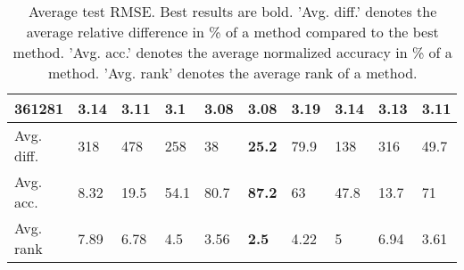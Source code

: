 \begin{table}[ht!]
\begin{tabular}{llllllllll}
  361281 & 3.14 & 3.11 & 3.1 & \textbf{3.08} & \textbf{3.08} & 3.19 & 3.14 & 3.13 & 3.11 \\ 
   \hline
Avg. diff. & 318 & 478 & 258 & 38 & \textbf{25.2} & 79.9 & 138 & 316 & 49.7 \\ 
  Avg. acc. & 8.32 & 19.5 & 54.1 & 80.7 & \textbf{87.2} & 63 & 47.8 & 13.7 & 71 \\ 
  Avg. rank & 7.89 & 6.78 & 4.5 & 3.56 & \textbf{2.5} & 4.22 & 5 & 6.94 & 3.61 \\ 
   \hline
\hline
\end{tabular}
\endgroup
\caption{Average test RMSE. 
                  Best results are bold. 
                  'Avg. diff.' denotes the average relative difference in \% of a method compared to the best method.
                  'Avg. acc.' denotes the average normalized accuracy in \% of a method.
                  'Avg. rank' denotes the average rank of a method.} 
\label{TABLES/table_results_RMSE_spatial_depth}
\end{table}
